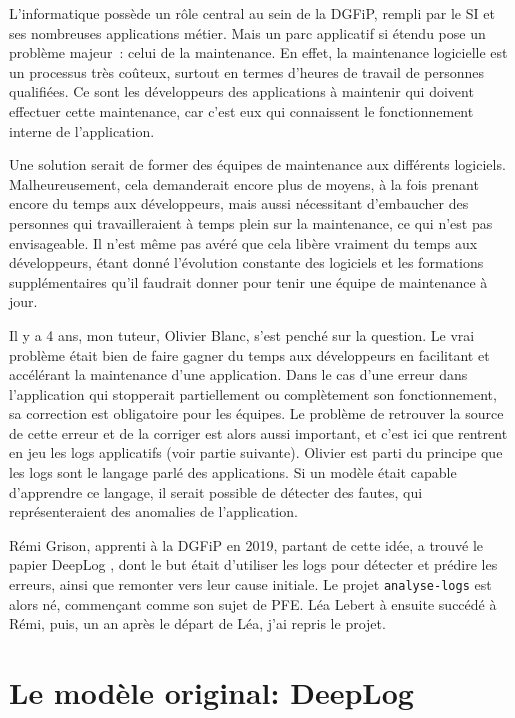 \documentclass[openany, 11pt]{memoir}
\begin{document}
L'informatique possède un rôle central au sein de la \gls{DGFiP}, rempli par le \gls{SI} et ses nombreuses applications métier. Mais un parc applicatif si étendu pose un problème majeur~: celui de la maintenance. En effet, la maintenance logicielle est un processus très coûteux, surtout en termes d'heures de travail de personnes qualifiées. Ce sont les développeurs des applications à maintenir qui doivent effectuer cette maintenance, car c'est eux qui connaissent le fonctionnement interne de l'application.

Une solution serait de former des équipes de maintenance aux différents logiciels. Malheureusement, cela demanderait encore plus de moyens, à la fois prenant encore du temps aux développeurs, mais aussi nécessitant d'embaucher des personnes qui travailleraient à temps plein sur la maintenance, ce qui n'est pas envisageable. Il n'est même pas avéré que cela libère vraiment du temps aux développeurs, étant donné l'évolution constante des logiciels et les formations supplémentaires qu'il faudrait donner pour tenir une équipe de maintenance à jour.

\bigskip
Il y a 4 ans, mon tuteur, Olivier Blanc, s'est penché sur la question. Le vrai problème était bien de faire gagner du temps aux développeurs en facilitant et accélérant la maintenance d'une application. Dans le cas d'une erreur dans l'application qui stopperait partiellement ou complètement son fonctionnement, sa correction est obligatoire pour les équipes. Le problème de retrouver la source de cette erreur et de la corriger est alors aussi important, et c'est ici que rentrent en jeu les \glspl{log} applicatifs (voir partie suivante). Olivier est parti du principe que les logs sont le langage parlé des applications. Si un modèle était capable d'apprendre ce langage, il serait possible de détecter des fautes, qui représenteraient des anomalies de l'application.

Rémi Grison, apprenti à la DGFiP en 2019, partant de cette idée, a trouvé le papier DeepLog \cite{deeplog}, dont le but était d'utiliser les logs pour détecter et prédire les erreurs, ainsi que remonter vers leur cause initiale. Le projet \texttt{analyse-logs} est alors né, commençant comme son sujet de PFE. Léa Lebert à ensuite succédé à Rémi, puis, un an après le départ de Léa, j'ai repris le projet.

\section{Le modèle original: DeepLog}
\end{document}
